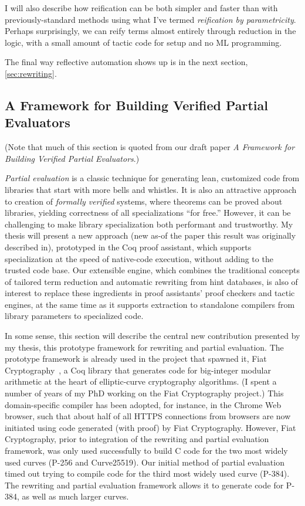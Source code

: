 \documentclass[twoside]{article}
\begin{document}
I will also describe how reification can be both simpler and faster than with previously-standard methods using what I've termed \emph{reification by parametricity}.
Perhaps surprisingly, we can reify terms almost entirely through reduction in the logic, with a small amount of tactic code for setup and no ML programming.

The final way reflective automation shows up is in the next section, \autoref{sec:rewriting}.

\subsection{A Framework for Building Verified Partial Evaluators} \label{sec:rewriting}

(Note that much of this section is quoted from our draft paper \emph{A Framework for Building Verified Partial Evaluators}.)

\emph{Partial evaluation} is a classic technique for generating lean, customized code from libraries that start with more bells and whistles.
It is also an attractive approach to creation of \emph{formally verified} systems, where theorems can be proved about libraries, yielding correctness of all specializations ``for free.''
However, it can be challenging to make library specialization both performant and trustworthy.
My thesis will present a new approach (new as-of the paper this result was originally described in), prototyped in the Coq proof assistant, which supports specialization at the speed of native-code execution, without adding to the trusted code base.
Our extensible engine, which combines the traditional concepts of tailored term reduction and automatic rewriting from hint databases, is also of interest to replace these ingredients in proof assistants' proof checkers and tactic engines, at the same time as it supports extraction to standalone compilers from library parameters to specialized code.

In some sense, this section will describe the central new contribution presented by my thesis, this prototype framework for rewriting and partial evaluation.
The prototype framework is already used in the project that spawned it, Fiat Cryptography~\cite{FiatCryptoSP19}, a Coq library that generates code for big-integer modular arithmetic at the heart of elliptic-curve cryptography algorithms.
(I spent a number of years of my PhD working on the Fiat Cryptography project.)
This domain-specific compiler has been adopted, for instance, in the Chrome Web browser, such that about half of all HTTPS connections from browsers are now initiated using code generated (with proof) by Fiat Cryptography.
However, Fiat Cryptography, prior to integration of the rewriting and partial evaluation framework, was only used successfully to build C code for the two most widely used curves (P-256 and Curve25519).
Our initial method of partial evaluation timed out trying to compile code for the third most widely used curve (P-384).
The rewriting and partial evaluation framework allows it to generate code for P-384, as well as much larger curves.
\end{document}
